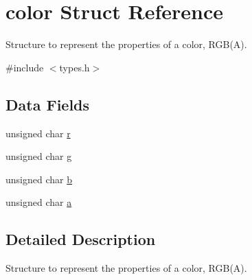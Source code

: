 \hypertarget{structcolor}{
\section{color Struct Reference}
\label{structcolor}
}


Structure to represent the properties of a color, RGB(A).  




{\ttfamily \#include $<$types.h$>$}

\subsection*{Data Fields}
\begin{DoxyCompactItemize}
\item 
unsigned char \hyperlink{structcolor_a0554e0c9f9fabb6b03cffa5bddaca93f}{r}
\item 
unsigned char \hyperlink{structcolor_aee30bc30855695b3baf97597387f13f5}{g}
\item 
unsigned char \hyperlink{structcolor_a3c8a2e9dac4499a3fa1fce76a6491db0}{b}
\item 
unsigned char \hyperlink{structcolor_a5b6b6fa87e1ea08d62dd2ddda8358bf4}{a}
\end{DoxyCompactItemize}


\subsection{Detailed Description}
Structure to represent the properties of a color, RGB(A). 

